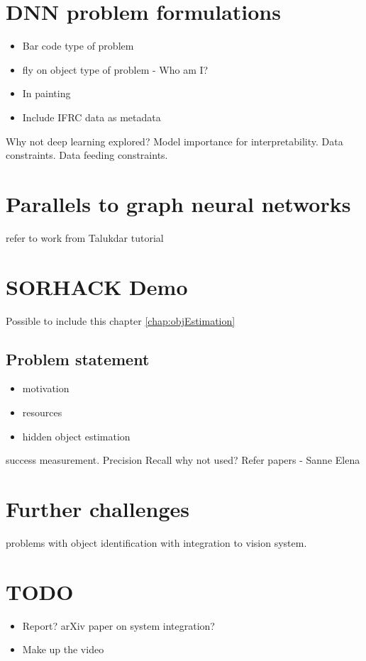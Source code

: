 \section{DNN problem formulations}
\begin{itemize}
\item Bar code type of problem
\item fly on object type of problem - Who am I?
\item In painting
\item Include IFRC data as metadata
\end{itemize}
Why not deep learning explored? Model importance for interpretability. Data constraints. Data feeding constraints.
\section{Parallels to graph neural networks}
refer to work from Talukdar tutorial
\section{SORHACK Demo}
Possible to include this chapter \ref{chap:objEstimation}
\subsection{Problem statement}
\begin{itemize}
\item motivation
\item resources
\item hidden object estimation
\end{itemize}
success measurement. Precision Recall why not used? Refer papers - Sanne Elena
\section{Further challenges}problems with object identification with integration to vision system.
\section{TODO}
\begin{itemize}
\item Report? arXiv paper on system integration?
\item Make up the video
\end{itemize} 